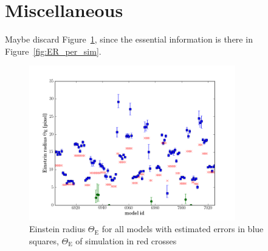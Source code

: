 \documentclass[12pt,preprint]{aastex}
\newcommand{\ERg}[1][]{$\Theta_{\text{E#1}}$\xspace} %
\newcommand{\ERf}[1][]{Einstein radius $\Theta_\text{E#1}$\xspace} %
\newcommand{\figref}[1]{Figure~\ref{fig:#1}}
\begin{document}
\section{Miscellaneous}

Maybe discard \figref{ER_all_models}, since the essential information is there in \figref{ER_per_sim}.

\begin{figure}[htbp]
  \centering
    \includegraphics[width=0.80\textwidth]{fig/eR_1.png}
  \caption{\ERf for all models with estimated errors in blue squares, \ERg of simulation in red crosses}
  \label{fig:ER_all_models}
\end{figure}


\newpage



\end{document}
